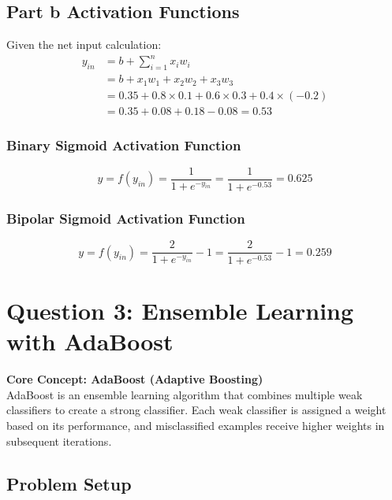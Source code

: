 \documentclass{exam}
\begin{document}
\subsection*{Part b Activation Functions}

Given the net input calculation:
\begin{align*}
y_{in} &= b + \sum_{i=1}^n x_i w_i \\
&= b + x_1w_1 + x_2w_2 + x_3w_3 \\
&= 0.35 + 0.8 \times 0.1 + 0.6 \times 0.3 + 0.4 \times (-0.2) \\
&= 0.35 + 0.08 + 0.18 - 0.08 = 0.53
\end{align*}

\subsubsection*{Binary Sigmoid Activation Function}
\begin{equation}
y = f(y_{in}) = \frac{1}{1 + e^{-y_{in}}} = \frac{1}{1 + e^{-0.53}} = 0.625
\end{equation}

\subsubsection*{Bipolar Sigmoid Activation Function}
\begin{equation}
y = f(y_{in}) = \frac{2}{1 + e^{-y_{in}}} - 1 = \frac{2}{1 + e^{-0.53}} - 1 = 0.259
\end{equation}

\section*{\textcolor{conceptblue}{Question 3: Ensemble Learning with AdaBoost}}

\begin{concept}
\textbf{Core Concept: AdaBoost (Adaptive Boosting)}\\
AdaBoost is an ensemble learning algorithm that combines multiple weak classifiers to create a strong classifier. Each weak classifier is assigned a weight based on its performance, and misclassified examples receive higher weights in subsequent iterations.
\end{concept}

\subsection*{Problem Setup}
\end{document}
